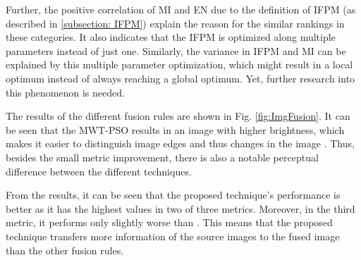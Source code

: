 \documentclass{article}
\begin{document}
Further, the positive correlation of MI and EN due to the definition of IFPM (as described in \ref{subsection: IFPM}) explain the reason for the similar rankings in these categories. It also indicates that the IFPM is optimized along multiple parameters instead of just one. Similarly, the variance in IFPM and MI can be explained by this multiple parameter optimization, which might result in a local optimum instead of always reaching a global optimum. Yet, further research into this phenomenon is needed.

The results of the different fusion rules are shown in Fig. \ref{fig:ImgFusion}. It can be seen that the MWT-PSO results in an image with higher brightness, which makes it easier to distinguish image edges and thus changes in the image \cite{Gonzalez.Woods.2008}. Thus, besides the small metric improvement, there is also a notable perceptual difference between the different techniques.

From the results, it can be seen that the proposed technique's performance is better as it has the highest values in two of three metrics. Moreover, in the third metric, it performs only slightly worse than \cite{Wang2004}. This means that the proposed technique transfers more information of the source images to the fused image than the other fusion rules.
 
\end{document}
